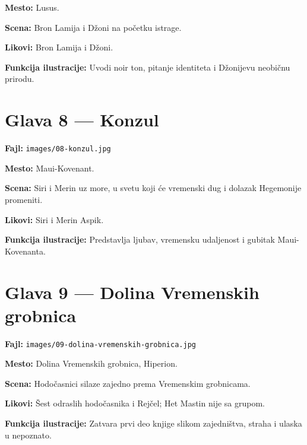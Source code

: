 \textbf{Mesto:} Lusus.

\textbf{Scena:} Bron Lamija i Džoni na početku istrage.

\textbf{Likovi:} Bron Lamija i Džoni.

\textbf{Funkcija ilustracije:} Uvodi noir ton, pitanje identiteta i Džonijevu neobičnu prirodu.

\section*{Glava 8 — Konzul}

\textbf{Fajl:} \texttt{images/08-konzul.jpg}

\textbf{Mesto:} Maui-Kovenant.

\textbf{Scena:} Siri i Merin uz more, u svetu koji će vremenski dug i dolazak Hegemonije promeniti.

\textbf{Likovi:} Siri i Merin Aspik.

\textbf{Funkcija ilustracije:} Predstavlja ljubav, vremensku udaljenost i gubitak Maui-Kovenanta.

\section*{Glava 9 — Dolina Vremenskih grobnica}

\textbf{Fajl:} \texttt{images/09-dolina-vremenskih-grobnica.jpg}

\textbf{Mesto:} Dolina Vremenskih grobnica, Hiperion.

\textbf{Scena:} Hodočasnici silaze zajedno prema Vremenskim grobnicama.

\textbf{Likovi:} Šest odraslih hodočasnika i Rejčel; Het Mastin nije sa grupom.

\textbf{Funkcija ilustracije:} Zatvara prvi deo knjige slikom zajedništva, straha i ulaska u nepoznato.